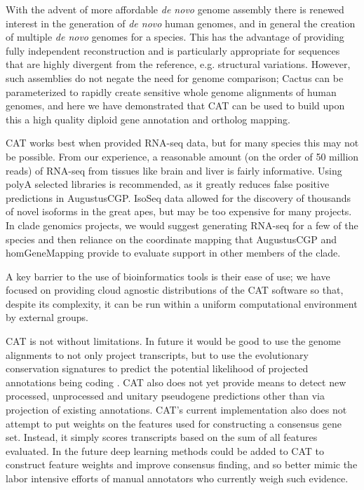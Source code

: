 \documentclass[fleqn,10pt]{wlscirep}
\begin{document}
With the advent of more affordable \textit{de novo} genome assembly there is renewed interest in the generation of \textit{de novo} human genomes, and in general the creation of multiple \textit{de novo} genomes for a species. This has the advantage of providing fully independent reconstruction and is particularly appropriate for sequences that are highly divergent from the reference, e.g. structural variations. However, such assemblies do not negate the need for genome comparison; Cactus can be parameterized to rapidly create sensitive whole genome alignments of human genomes, and here we have demonstrated that CAT can be used to build upon this a high quality diploid gene annotation and ortholog mapping. 

CAT works best when provided RNA-seq data, but for many species this may not be possible. From our experience, a reasonable amount (on the order of 50 million reads) of RNA-seq from tissues like brain and liver is fairly informative. Using polyA selected libraries is recommended, as it greatly reduces false positive predictions in AugustusCGP. IsoSeq data allowed for the discovery of thousands of novel isoforms in the great apes, but may be too expensive for many projects. In clade genomics projects, we would suggest generating RNA-seq for a few of the species and then reliance on the coordinate mapping that AugustusCGP and homGeneMapping provide to evaluate support in other members of the clade. 

A key barrier to the use of bioinformatics tools is their ease of use; we have focused on providing cloud agnostic distributions of the CAT software so that, despite its complexity, it can be run within a uniform computational environment by external groups. 

CAT is not without limitations. In future it would be good to use the genome alignments to not only project transcripts, but to use the evolutionary conservation signatures to predict the potential likelihood of projected annotations being coding \cite{lin2011phylocsf}. CAT also does not yet provide means to detect new processed, unprocessed and unitary pseudogene predictions other than via projection of existing annotations. CAT’s current implementation also does not attempt to put weights on the features used for constructing a consensus gene set. Instead, it simply scores transcripts based on the sum of all features evaluated. In the future deep learning methods could be added to CAT to construct feature weights and improve consensus finding, and so better mimic the labor intensive efforts of manual annotators who currently weigh such evidence. 
\end{document}
